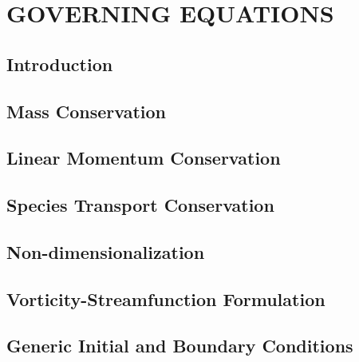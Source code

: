 \chapter{\textbf{GOVERNING EQUATIONS}}
\label{eqgov}

\section{\textbf{Introduction}} 

\label{intro equacoes de governo}

\section{\textbf{Mass Conservation}} 
\label{conservacao massa}



\section{\textbf{Linear Momentum Conservation}} 
\label{conservacao movimento}



\section{\textbf{Species Transport Conservation}} 
\label{conservacao especie}



\section{\textbf{Non-dimensionalization}} 
\label{adimensionalizacao}



\section{\textbf{Vorticity-Streamfunction Formulation}} 
\label{corrente vorticidade}



\section{\textbf{Generic Initial and Boundary Conditions}} 
\label{condicoes contorno}



